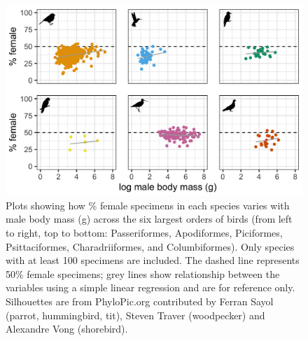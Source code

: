 \documentclass[a4paper, 12pt]{article}
\begin{document}
\begin{figure}
 \centering
  \includegraphics[width = \linewidth]{figures/mass-orders-birds.png}
  \caption{Plots showing how \% female specimens in each species varies with male body mass (g) across the six largest orders of birds (from left to right, top to bottom: Passeriformes, Apodiformes, Piciformes, Psittaciformes, Charadriiformes, and Columbiformes). 
  Only species with at least 100 specimens are included. 
  The dashed line represents 50\% female specimens; grey lines show relationship between the variables using a simple linear regression and are for reference only. 
  Silhouettes are from PhyloPic.org contributed by Ferran Sayol (parrot, hummingbird, tit), Steven Traver (woodpecker) and Alexandre Vong (shorebird).}
  \label{fig-bird-male-mass}
\end{figure}
\end{document}

